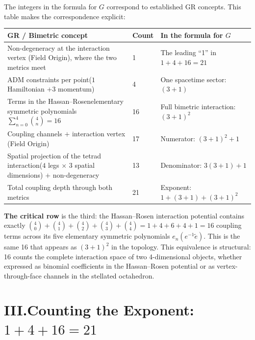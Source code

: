 \documentclass[11pt]{article}
\begin{document}
The integers in the formula for $G$ correspond to established GR concepts.
This table makes the correspondence explicit:

\begin{center}
\renewcommand{\arraystretch}{1.3}
\begin{tabular}{>{\raggedright}p{5cm}lp{5cm}}
\toprule
\textbf{GR / Bimetric concept} & \textbf{Count} & \textbf{In the formula for $G$} \\
\midrule
Non-degeneracy at the interaction vertex (Field Origin), where the two metrics meet & 1 & The leading ``1'' in $1 + 4 + 16 = 21$ \\[6pt]
ADM constraints per point\newline ($1$ Hamiltonian $+ 3$ momentum) & 4 & One spacetime sector: $(3+1)$ \\[6pt]
Terms in the Hassan--Rosen\newline elementary symmetric polynomials $\sum_{n=0}^{4}\binom{4}{n} = 16$ & 16 & Full bimetric interaction: $(3+1)^2$ \\[6pt]
Coupling channels $+$ interaction vertex (Field Origin) & 17 & Numerator: $(3+1)^2 + 1$ \\[6pt]
Spatial projection of the tetrad interaction\newline ($4$ legs $\times$ $3$ spatial dimensions) $+$ non-degeneracy & 13 & Denominator: $3(3+1) + 1$ \\[6pt]
Total coupling depth through both metrics & 21 & Exponent: $1 + (3+1) + (3+1)^2$ \\
\bottomrule
\end{tabular}
\end{center}

\textbf{The critical row} is the third: the Hassan--Rosen interaction potential contains exactly $\binom{4}{0} + \binom{4}{1} + \binom{4}{2} + \binom{4}{3} + \binom{4}{4} = 1 + 4 + 6 + 4 + 1 = 16$ coupling terms across its five elementary symmetric polynomials $e_n(e^{-1}\tilde{e})$.
This is the same 16 that appears as $(3+1)^2$ in the topology.
This equivalence is structural: 16 counts the complete interaction space of two 4-dimensional objects, whether expressed as binomial coefficients in the Hassan--Rosen potential or as vertex-through-face channels in the stellated octahedron.

\section*{III.\quad Counting the Exponent: $1 + 4 + 16 = 21$}
\end{document}
